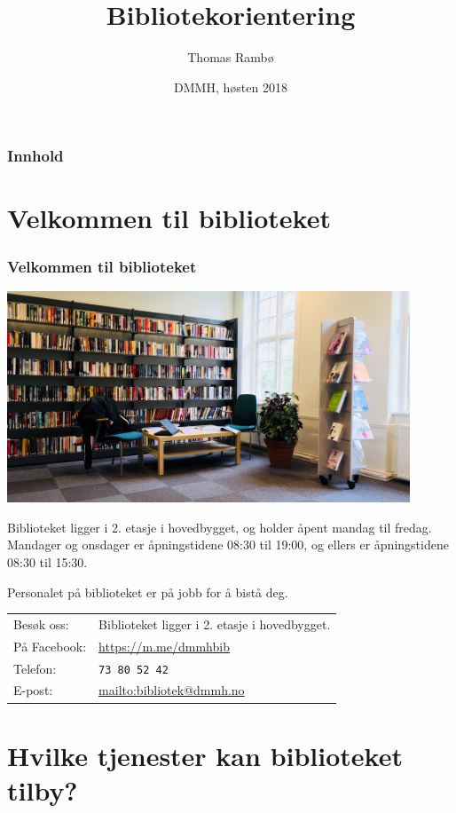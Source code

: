 \documentclass{beamer}
\title{Bibliotekorientering}
\author{Thomas Rambø\inst{1}}
\institute[DMMH-biblioteket]{
  \inst{1}
  Biblioteket\\
  Dronning Mauds Minne Høgskole
}
\date[DMMH 2018]{DMMH, høsten 2018}
\begin{document}
\frame{\titlepage}
\begin{frame}
  \frametitle{Innhold}
  \tableofcontents
\end{frame}

\section{Velkommen til biblioteket}
\begin{frame}
  \frametitle{Velkommen til biblioteket}
  \centering
  \includegraphics[width=0.90\textwidth]{media/nytt-bibliotek.png}
\end{frame}
\begin{frame}
  Biblioteket ligger i 2. etasje i hovedbygget, og holder åpent mandag til fredag. Mandager og onsdager er åpningstidene \alert{08:30 til 19:00}, og ellers er åpningstidene \alert{08:30 til 15:30}.
\end{frame}
\begin{frame}
  Personalet på biblioteket er på jobb for å bistå deg.

  \vfill
  \begin{tabular}{ l | l }
    Besøk oss: & Biblioteket ligger i 2. etasje i hovedbygget. \\
    På Facebook: & \url{https://m.me/dmmhbib} \\
    Telefon: & \texttt{73 80 52 42} \\
    E-post: & \url{mailto:bibliotek@dmmh.no}
  \end{tabular}
\end{frame}

\section{Hvilke tjenester kan biblioteket tilby?}
\end{document}

